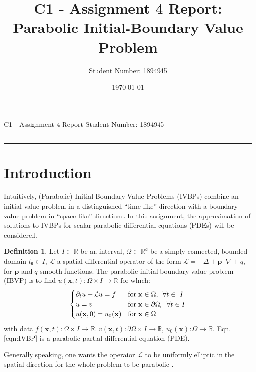\documentclass[11pt]{article}
\title{C1 - Assignment 4 Report: Parabolic Initial-Boundary Value Problem} %
\author{Student Number: 1894945} %
\date{\today} %
\theoremstyle{theorem}
\theoremstyle{definition}
\newtheorem{definition}{Definition}
\begin{document}
\maketitle %

\begin{center}
C1 - Assignment 4 Report \hfill
Student Number: 1894945
\vspace{3pt} \hrule \vspace{3pt} \hrule
\end{center}

\tableofcontents

\clearpage



\section{Introduction}
Intuitively, (Parabolic) Initial-Boundary Value Problems (IVBPs) combine an initial value problem in a distinguished “time-like” direction with a boundary value
problem in “space-like” directions. In this assignment, the approximation of solutions to IVBPs for scalar parabolic differential equations (PDEs) will be considered.

\begin{definition}
	\label{def:IVBP}
	Let $I\subset\mathbb{R}$ be an interval, $\Omega\subset\mathbb{R^d}$ be a simply connected, bounded domain $t_0\in I$, $\mathcal{L}$ a spatial differential operator of the form $\mathcal{L}=-\Delta+\mathbf{p}\cdot\nabla+q$, for $\mathbf{p}$ and $q$ smooth functions. The parabolic initial boundary-value problem (IBVP) is to find $u(\mathbf{x},t):\Omega\times I\to\mathbb{R}$ for which:
	\begin{align}
		\label{eqn:IVBP}
		\begin{cases}
		\partial_t u+\mathcal{L}u=f &\text{for}\hspace{1mm}\mathbf{x}\in\Omega,\hspace{2mm}\forall t\in\ I\\
		u=v &\text{for}\hspace{1mm}\mathbf{x}\in\partial\Omega,\hspace{2mm}\forall t\in I\\
		u(\mathbf{x},0)=u_0(\mathbf{x}) &\text{for}\hspace{1mm}\mathbf{x}\in\Omega
		\end{cases}
	\end{align} 
	with data $f(\mathbf{x},t):\Omega\times I\to\mathbb{R}$, $v(\mathbf{x},t):\partial\Omega\times I\to\mathbb{R}$, $u_0(\mathbf{x}):\Omega\to\mathbb{R}$. Eqn.\eqref{eqn:IVBP} is a parabolic partial differential equation (PDE).\\
\end{definition}
Generally speaking, one wants the operator $\mathcal{L}$ to be uniformly elliptic in the spatial direction for the whole problem to be parabolic .\\
\end{document}
